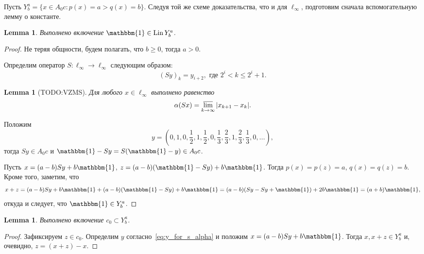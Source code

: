 \documentclass[a4paper,14pt]{article} %
\theoremstyle{plain}
\newtheorem{lemma}[theorem]{Lemma}
\theoremstyle{definition}
\begin{document}
Пусть $Y^a_b = \{x\in A_0 c : p(x) = a > q(x) = b\}$.
Следуя той же схеме доказательства, что и для $\ell_\infty$,
подготовим сначала вспомогательную лемму о константе.

\begin{lemma}
	\label{lem:const_Lin_alpha_0}
	Выполнено включение
	$\mathbbm{1}\in \operatorname{Lin} Y^a_b$.
\end{lemma}

\begin{proof}
	Не теряя общности, будем полагать, что $b\geq 0$, тогда $a>0$.

	Определим оператор $S:\ell_\infty \to \ell_\infty$ следующим образом:
	\begin{equation}\label{operator_S}
		(Sy)_k = y_{i+2}, \mbox{ где } 2^i < k \leq 2^i+1
		.
	\end{equation}
	\begin{lemma}[TODO:VZMS]
		Для любого $x\in \ell_\infty$ выполнено равенство
		\begin{equation}\label{alpha_S}
			\alpha(Sx) = \varlimsup_{k\to\infty} |x_{k+1} - x_{k}|
			.
		\end{equation}
	\end{lemma}
	Положим
	\begin{equation}
		\label{eq:y_for_s_alpha}
		y = \left(0,1,0,\frac{1}{2},1,\frac{1}{2},0,\frac{1}{3},\frac{2}{3},1,\frac{2}{3},\frac{1}{3},0,...\right)
		,
	\end{equation}
	тогда $Sy\in A_0 c$ и $\mathbbm{1}-Sy = S(\mathbbm{1}-y)\in A_0 c$.

	Пусть $x=(a-b)Sy+b\mathbbm{1}$, $z=(a-b)(\mathbbm{1}-Sy)+b\mathbbm{1}$.
	Тогда $p(x)=p(z)=a$, $q(x)=q(z)=b$.
	Кроме того, заметим, что
	\begin{equation}
		x+z = (a-b)Sy+b\mathbbm{1} + (a-b)(\mathbbm{1}-Sy)+b\mathbbm{1}
		=
		(a-b)(Sy-Sy+\mathbbm{1}) + 2 b\mathbbm{1} = (a+b)\mathbbm{1}
		,
	\end{equation}
	откуда и следует, что $\mathbbm{1}\in Y^a_b$.
\end{proof}

\begin{lemma}
	\label{lem:c_0_Lin_alpha_0}
	Выполнено включение $c_0 \subset Y^a_b$.
\end{lemma}

\begin{proof}
	Зафиксируем $z\in c_0$.
	Определим $y$ согласно~\eqref{eq:y_for_s_alpha} и положим
	$x=(a-b)Sy+b\mathbbm{1}$.
	Тогда $x, x+z\in Y^a_b$ и, очевидно, $z=(x+z)-x$.
\end{proof}
\end{document}
